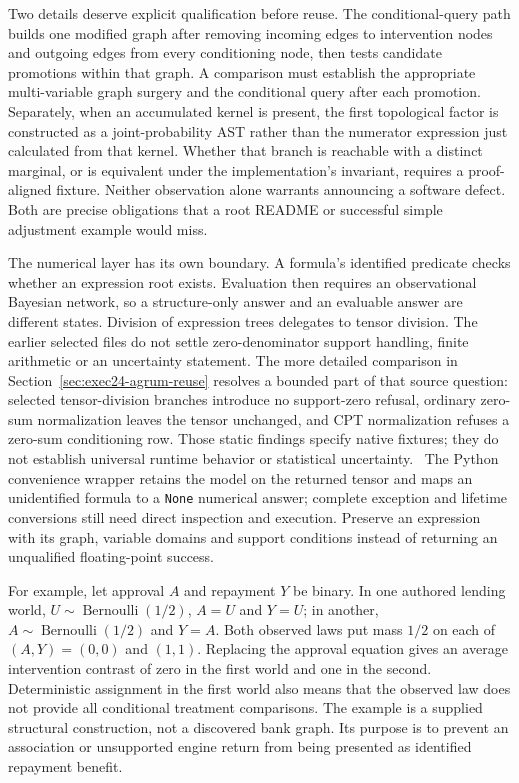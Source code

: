 Two details deserve explicit qualification before reuse. The conditional-query
path builds one modified graph after removing incoming edges to intervention
nodes and outgoing edges from every conditioning node, then tests candidate
promotions within that graph. A comparison must establish the appropriate
multi-variable graph surgery and the conditional query after each promotion.
Separately, when an accumulated kernel is present, the first topological
factor is constructed as a joint-probability AST rather than the numerator
expression just calculated from that kernel. Whether that branch is reachable
with a distinct marginal, or is equivalent under the implementation's invariant,
requires a proof-aligned fixture. Neither observation alone warrants announcing
a software defect. Both are precise obligations that a root README or successful
simple adjustment example would miss.
\citep{exec19_cxx_identification_source}

The numerical layer has its own boundary. A formula's identified predicate
checks whether an expression root exists. Evaluation then requires an
observational Bayesian network, so a structure-only answer and an evaluable
answer are different states. Division of expression trees delegates to tensor
division. The earlier selected files do not settle zero-denominator support
handling, finite arithmetic or an uncertainty statement. The more detailed
comparison in Section~\ref{sec:exec24-agrum-reuse} resolves a bounded part of
that source question: selected tensor-division branches introduce no support-zero
refusal, ordinary zero-sum normalization leaves the tensor unchanged, and CPT
normalization refuses a zero-sum conditioning row. Those static findings specify
native fixtures; they do not establish universal runtime behavior or statistical
uncertainty.~\citep{exec24_agrum_source,exec24_agrum_choice}
The Python convenience wrapper
retains the model on the returned tensor and maps an unidentified formula to a
\texttt{None} numerical answer; complete exception and lifetime conversions
still need direct inspection and execution. Preserve an expression with its
graph, variable domains and support conditions instead of returning an
unqualified floating-point success.
\citep{exec19_cxx_identification_source}

For example, let approval $A$ and repayment $Y$ be binary. In one authored
lending world, $U\sim\operatorname{Bernoulli}(1/2)$, $A=U$ and $Y=U$;
in another, $A\sim\operatorname{Bernoulli}(1/2)$ and $Y=A$. Both observed laws
put mass $1/2$ on each of $(A,Y)=(0,0)$ and $(1,1)$. Replacing the approval
equation gives an average intervention contrast of zero in the first world
and one in the second. Deterministic assignment in the first world also means
that the observed law does not provide all conditional treatment comparisons.
The example is a supplied structural construction, not a discovered bank graph.
Its purpose is to prevent an association or unsupported engine return from
being presented as identified repayment benefit.
\citep{exec19_cxx_identification_reference}

